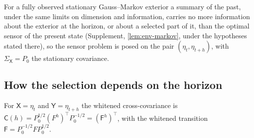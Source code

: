 For a fully observed stationary Gauss--Markov exterior a summary of the past, under the same limits on dimension and information, carries no more information about the exterior at the horizon, or about a selected part of it, than the optimal sensor of the present state (Supplement, \cref{lem:env-markov}, under the hypotheses stated there), so the sensor problem is posed on the pair $(\eta_t,\eta_{t+h})$, with $\Sigma_{\mathsf X}=P_0$ the stationary covariance.

\subsection{How the selection depends on the horizon}\label{sec:env-horizon}

For $\mathsf X=\eta_t$ and $\mathsf Y=\eta_{t+h}$ the whitened cross-covariance is $\mathsf C(h)=P_0^{1/2}(F^h)^\top P_0^{-1/2}=(\mathsf F^h)^\top$, with the whitened transition $\mathsf F=P_0^{-1/2}FP_0^{1/2}$.

